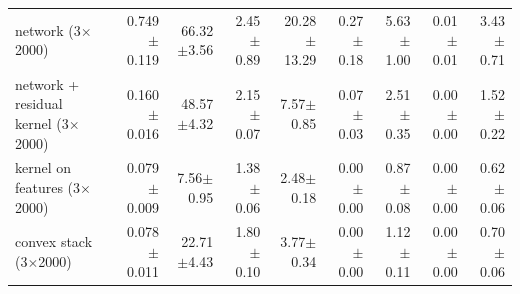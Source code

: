 \begin{tabular}{lrrrrrrrr}
network (3$\times$2000) & 0.749$\pm$0.119 & 66.32$\pm$3.56 & 2.45$\pm$0.89 & 20.28$\pm$13.29 & 0.27$\pm$0.18 & 5.63$\pm$1.00 & 0.01$\pm$0.01 & 3.43$\pm$0.71 \\
network + residual kernel (3$\times$2000) & 0.160$\pm$0.016 & 48.57$\pm$4.32 & 2.15$\pm$0.07 & 7.57$\pm$0.85 & 0.07$\pm$0.03 & 2.51$\pm$0.35 & 0.00$\pm$0.00 & 1.52$\pm$0.22 \\
kernel on features (3$\times$2000) & 0.079$\pm$0.009 & 7.56$\pm$0.95 & 1.38$\pm$0.06 & 2.48$\pm$0.18 & 0.00$\pm$0.00 & 0.87$\pm$0.08 & 0.00$\pm$0.00 & 0.62$\pm$0.06 \\
convex stack (3$\times$2000) & 0.078$\pm$0.011 & 22.71$\pm$4.43 & 1.80$\pm$0.10 & 3.77$\pm$0.34 & 0.00$\pm$0.00 & 1.12$\pm$0.11 & 0.00$\pm$0.00 & 0.70$\pm$0.06 \\
\bottomrule
\end{tabular}
